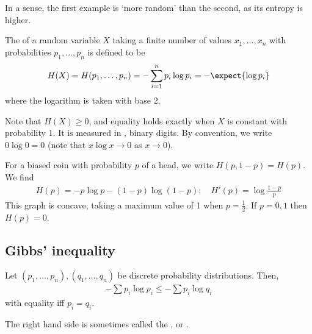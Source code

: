 In a sense, the first example is `more random' than the second, as its entropy is higher.

\begin{definition}[Entropy]
    The  of a random variable $X$ taking a finite number of values $x_1, \dots, x_n$ with probabilities $p_1, \dots, p_n$ is defined to be
    \begin{align*}
        H(X) = H(p_1, \dots, p_n) = -\sum_{i=1}^n p_i \log p_i = -\expect{\log p_i}
    \end{align*}
    where the logarithm is taken with base 2.
\end{definition}

Note that $H(X) \geq 0$, and equality holds exactly when $X$ is constant with probability 1.
It is measured in , binary digits.
By convention, we write $0 \log 0 = 0$ (note that $x \log x \to 0$ as $x \to 0$).

\begin{example}
    For a biased coin with probability $p$ of a head, we write $H(p,1-p) = H(p)$.
    We find
    \begin{align*}
        H(p) = -p\log p - (1-p)\log(1-p);\quad H'(p) = \log \frac{1-p}{p}
    \end{align*}
    This graph is concave, taking a maximum value of 1 when $p = \frac{1}{2}$.
    If $p = 0, 1$ then $H(p) = 0$.
\end{example}

\subsection{Gibbs' inequality}
\begin{proposition}
    Let $(p_1, \dots, p_n), (q_1, \dots, q_n)$ be discrete probability distributions.
    Then,
    \begin{align*}
        -\sum p_i \log p_i \leq -\sum p_i \log q_i
    \end{align*}
    with equality iff $p_i = q_i$.
\end{proposition}

The right hand side is sometimes called the , or .

